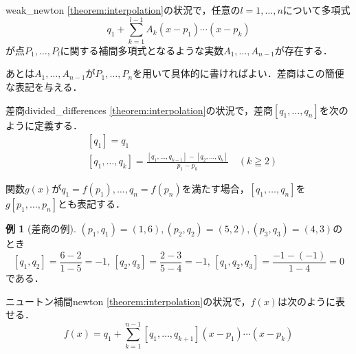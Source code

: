 \documentclass[a4paper]{ltjsarticle}
\theoremstyle{definition}
\newtheorem{example}{例}[section]
\begin{document}
\begin{theorem}{}{weak_newton}
  \cref{theorem:interpolation}の状況で，任意の$l=1,\dots,n$について多項式
  \[
    q_1 + \sum_{k=1}^{l-1} A_k(x-p_1)\dotsm (x-p_k)
  \]
  が点$P_1,\dots,P_l$に関する補間多項式となるような実数$A_1,\dots,A_{n-1}$が存在する．
\end{theorem}

あとは$A_1,\dots,A_{n-1}$が$P_1,\dots,P_n$を用いて具体的に書ければよい．差商はこの簡便な表記を与える．

\begin{definition}{差商}{divided_differences}
  \cref{theorem:interpolation}の状況で，差商$[q_1, \dots, q_n]$を次のように定義する．
  \begin{align*}
    &[q_1] = q_1\\
    &[q_1,\dots,q_k] = \frac{[q_1,\dots,q_{k-1}]-[q_2,\dots,q_k]}{p_1-p_k} \quad (k \geqq 2)
  \end{align*}

  関数$g(x)$が$q_1=f(p_1),\dots,q_n=f(p_n)$を満たす場合，$[q_1,\dots,q_n]$を$g[p_1,\dots,p_n]$とも表記する．
\end{definition}

\begin{example}[差商の例]
  \label{example:divided_differences}
  $(p_1,q_1)=(1,6),(p_2,q_2)=(5,2),(p_3,q_3)=(4,3)$のとき
  \[
    [q_1, q_2] = \frac{6-2}{1-5} = -1,\,
    [q_2, q_3] = \frac{2-3}{5-4} = -1,\,
    [q_1,q_2,q_3] = \frac{-1-(-1)}{1-4} = 0
  \]
  である．
\end{example}

\begin{theorem}{ニュートン補間}{newton}
  \cref{theorem:interpolation}の状況で，$f(x)$は次のように表せる．
  \[
    f(x) = q_1 + \sum_{k=1}^{n-1} [q_1,\dots,q_{k+1}] (x-p_1) \dotsm (x-p_k)
  \]
\end{theorem}
\end{document}
